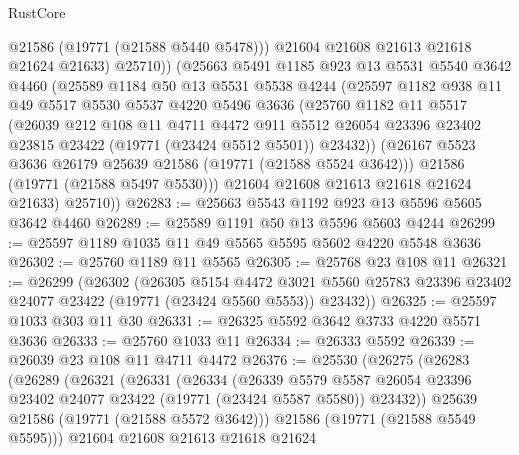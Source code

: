 \begin{lexlean}{RustCore}
\begin{coremodule}
              @21586
              (@19771 (@21588 @5440 @5478)))
            @21604
            @21608
            @21613
            @21618
            @21624
            @21633)
          @25710))
      (@25663
        @5491
        @1185
        @923
        @13
        @5531
        @5540
        @3642
        @4460
        (@25589
          @1184
          @50
          @13
          @5531
          @5538
          @4244
          (@25597
            @1182
            @938
            @11
            @49
            @5517
            @5530
            @5537
            @4220
            @5496
            @3636
            (@25760
              @1182
              @11
              @5517
              (@26039
                @212
                @108
                @11
                @4711
                @4472
                @911
                @5512
                @26054
                @23396
                @23402
                @23815
                @23422
                (@19771 (@23424 @5512 @5501))
                @23432))
            (@26167 @5523 @3636 @26179 @25639 @21586 (@19771 (@21588 @5524 @3642)))
            @21586
            (@19771 (@21588 @5497 @5530)))
          @21604
          @21608
          @21613
          @21618
          @21624
          @21633)
        @25710))
@26283 := @25663 @5543 @1192 @923 @13 @5596 @5605 @3642 @4460
@26289 := @25589 @1191 @50 @13 @5596 @5603 @4244
@26299 := @25597 @1189 @1035 @11 @49 @5565 @5595 @5602 @4220 @5548 @3636
@26302 := @25760 @1189 @11 @5565
@26305 := @25768 @23 @108 @11
@26321 := @26299
    (@26302
      (@26305
        @5154
        @4472
        @3021
        @5560
        @25783
        @23396
        @23402
        @24077
        @23422
        (@19771 (@23424 @5560 @5553))
        @23432))
@26325 := @25597 @1033 @303 @11 @30
@26331 := @26325 @5592 @3642 @3733 @4220 @5571 @3636
@26333 := @25760 @1033 @11
@26334 := @26333 @5592
@26339 := @26039 @23 @108 @11 @4711 @4472
@26376 := @25530
    (@26275
      (@26283
        (@26289
          (@26321
            (@26331
              (@26334
                (@26339
                  @5579
                  @5587
                  @26054
                  @23396
                  @23402
                  @24077
                  @23422
                  (@19771 (@23424 @5587 @5580))
                  @23432))
              @25639
              @21586
              (@19771 (@21588 @5572 @3642)))
            @21586
            (@19771 (@21588 @5549 @5595)))
          @21604
          @21608
          @21613
          @21618
          @21624

\end{coremodule}
\end{lexlean}
